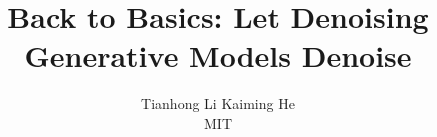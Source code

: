 \documentclass[10pt,twocolumn,letterpaper]{article}
\begin{document}
\title{
Back to Basics: Let Denoising Generative Models Denoise
}

\author{
Tianhong Li \qquad Kaiming He \vspace{.5em} \\
MIT
\vspace{1.em}
}


\maketitle

\begin{abstract}

\end{abstract}













\appendix


{\small


}

\clearpage


\end{document}
